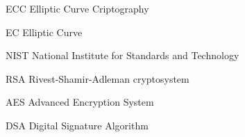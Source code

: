 \begin{siglas}
  \item[ECC] Elliptic Curve Criptography
  \item[EC] Elliptic Curve
  \item[NIST] National Institute for Standards and Technology
  \item[RSA] Rivest-Shamir-Adleman cryptosystem
  \item[AES] Advanced Encryption System
  \item[DSA] Digital Signature Algorithm
\end{siglas}
